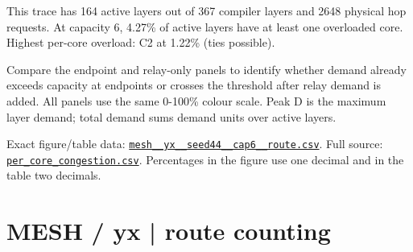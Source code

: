 \documentclass[10pt,a4paper]{article}
\begin{document}
This trace has 164 active layers out of 367 compiler layers and 2648 physical hop requests. At capacity 6, 4.27\% of active layers have at least one overloaded core. Highest per-core overload: C2 at 1.22\% (ties possible).\par
Compare the endpoint and relay-only panels to identify whether demand already exceeds capacity at endpoints or crosses the threshold after relay demand is added. All panels use the same 0-100\% colour scale. Peak D is the maximum layer demand; total demand sums demand units over active layers.\par
Exact figure/table data: \href{\detokenize{file:///home/dhruv-pansuriya/Documents/BTP/Compiler-Driven-ACE/output/pdf/qaoa_methods_congestion/tables/mesh__yx__seed44__cap6__route.csv}}{\nolinkurl{mesh__yx__seed44__cap6__route.csv}}. Full source: \href{\detokenize{file:///home/dhruv-pansuriya/Documents/BTP/Compiler-Driven-ACE/results/qaoa_2seed_2026-10-26/congestion/per_core_congestion.csv}}{\nolinkurl{per_core_congestion.csv}}. Percentages in the figure use one decimal and in the table two decimals.\par
\clearpage
\section*{MESH / yx | route counting}
\end{document}
